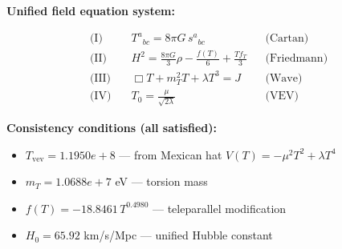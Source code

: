 
\textbf{Unified field equation system:}

\begin{align}
  \text{(I)} \quad & T^a{}_{bc} = 8\pi G \, s^a{}_{bc} && \text{(Cartan)} \\
  \text{(II)} \quad & H^2 = \frac{8\pi G}{3}\rho - \frac{f(T)}{6} + \frac{Tf_T}{3} && \text{(Friedmann)} \\
  \text{(III)} \quad & \Box T + m_T^2 T + \lambda T^3 = J && \text{(Wave)} \\
  \text{(IV)} \quad & T_0 = \frac{\mu}{\sqrt{2\lambda}} && \text{(VEV)}
\end{align}

\textbf{Consistency conditions (all satisfied):}
\begin{itemize}
  \item $T_{\text{vev}} = 1.1950e+8$ — from Mexican hat $V(T) = -\mu^2 T^2 + \lambda T^4$
  \item $m_T = 1.0688e+7$ eV — torsion mass
  \item $f(T) = -18.8461 \, T^{0.4980}$ — teleparallel modification
  \item $H_0 = 65.92$ km/s/Mpc — unified Hubble constant
\end{itemize}